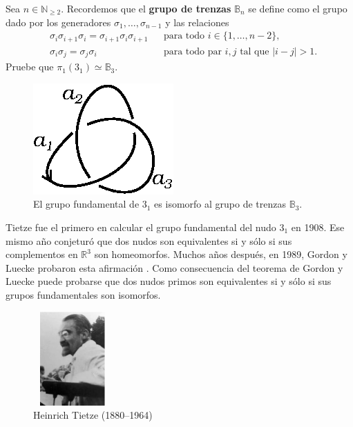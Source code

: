 \documentclass[graybox]{svmult}
\newcommand{\N}{\mathbb{N}}
\newcommand{\B}{\mathbb{B}}
\newcommand{\R}{\mathbb{R}}
\begin{document}
\begin{exercise}
    Sea $n\in\N_{\geq2}$. Recordemos que el \textbf{grupo de trenzas} $\B_n$ se
    define como el grupo dado por los generadores $\sigma_1,\dots,\sigma_{n-1}$
    y las relaciones 
    \begin{align*}
        &\sigma_i\sigma_{i+1}\sigma_i=\sigma_{i+1}\sigma_i\sigma_{i+1} && \text{para todo $i\in\{1,\dots,n-2\}$},\\
        &\sigma_i\sigma_j=\sigma_j\sigma_i && \text{para todo par $i,j$ tal que $|i-j|>1$}.
    \end{align*}
    Pruebe que $\pi_1(3_1)\simeq\B_3$. 
\end{exercise}

\begin{figure}[ht]
	\centering
	\includegraphics[scale=0.7]{images/3_1}
    \caption{El grupo fundamental de $3_1$ es isomorfo al grupo de trenzas $\B_3$.}
	\label{fig:oriented:3_1}
\end{figure}

Tietze fue el primero en calcular el grupo fundamental del nudo $3_1$ en
1908. Ese mismo año conjeturó que dos nudos son equivalentes si y sólo si
sus complementos en $\R^3$ son homeomorfos. Muchos años después, en 1989,
Gordon y Luecke probaron esta afirmación \cite{MR965210}.  Como
consecuencia del teorema de Gordon y Luecke puede probarse que dos nudos
primos son equivalentes si y sólo si sus grupos fundamentales son
isomorfos. 

\begin{figure}[ht]
	\centering
    \includegraphics[width=30mm,height=36mm]{images/tietze}
    \caption{Heinrich Tietze (1880--1964)}
\end{figure}
\end{document}
